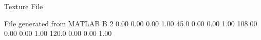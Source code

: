 Texture File

File generated from MATLAB
B 2
   0.00   0.00   0.00  1.00
   45.0   0.00   0.00  1.00
   108.00   0.00   0.00  1.00
   120.0   0.00   0.00  1.00
